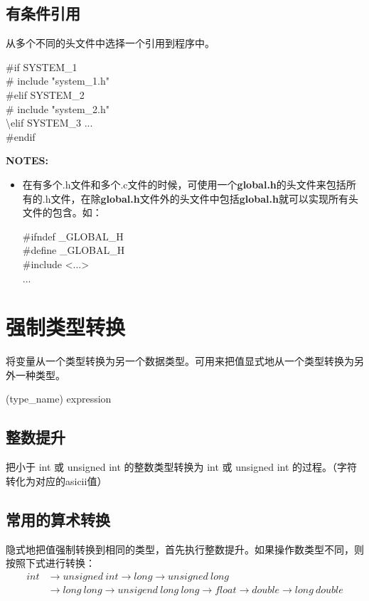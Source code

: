 \documentclass[UTF8]{ctexart}
\begin{document}
			\subsection{有条件引用}
			从多个不同的头文件中选择一个引用到程序中。\begin{framed}
				\#if SYSTEM\_1\\
				\# include "system\_1.h"\\
				\#elif SYSTEM\_2\\
				\# include "system\_2.h"\\
				\textbackslash elif SYSTEM\_3
				...\\
				\#endif\\
			\end{framed}
			\begin{framed}
				\textbf{NOTES:}\\
				\begin{itemize}
					\item 在有多个.h文件和多个.c文件的时候，可使用一个\textbf{global.h}的头文件来包括所有的.h文件，在除\textbf{global.h}文件外的头文件中包括\textbf{global.h}就可以实现所有头文件的包含。如：\begin{framed}
						\#ifndef \_GLOBAL\_H\\
						\#define \_GLOBAL\_H\\
						\#include <...>\\
						...\\
					\end{framed}
				\end{itemize}
			\end{framed}
			\section{强制类型转换}
			将变量从一个类型转换为另一个数据类型。可用来把值显式地从一个类型转换为另外一种类型。
			\begin{framed}
				(type\_name) expression
			\end{framed}
			\subsection{整数提升}
			把小于 int 或 unsigned int 的整数类型转换为 int 或 unsigned int 的过程。（字符转化为对应的asicii值）
			\subsection{常用的算术转换}
			隐式地把值强制转换到相同的类型，首先执行整数提升。如果操作数类型不同，则按照下式进行转换：\begin{align*}
				int& \rightarrow unsigned\ int \rightarrow long \rightarrow unsigned\ long \\ &\rightarrow long\ long \rightarrow unsigend\ long\ long \rightarrow float \rightarrow double \rightarrow long\ double
			\end{align*}
\end{document}
